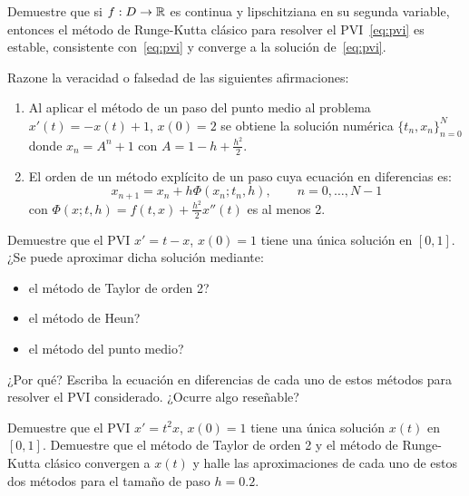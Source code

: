\begin{ejercicio}\label{ej:3.1.5}
    Demuestre que si $f : D \to \mathbb{R}$ es continua y lipschitziana en su segunda variable, entonces el método de Runge-Kutta clásico para resolver el PVI~\eqref{eq:pvi} es estable, consistente con~\eqref{eq:pvi} y converge a la solución de~\eqref{eq:pvi}.
\end{ejercicio}

\begin{ejercicio}\label{ej:3.1.6}
    Razone la veracidad o falsedad de las siguientes afirmaciones:
    \begin{enumerate}
        \item Al aplicar el método de un paso del punto medio al problema $x'(t) = -x(t) + 1$, $x(0) = 2$ se obtiene la solución numérica $\{t_n, x_n\}_{n=0}^N$ donde $x_n = A^n + 1$ con $A = 1 - h + \frac{h^2}{2}$.
        \item El orden de un método explícito de un paso cuya ecuación en diferencias es:
        \begin{equation*}
            x_{n+1} = x_n + h \Phi(x_n; t_n, h),\qquad n = 0, \ldots, N-1
        \end{equation*}
        con $\Phi(x; t, h) = f(t, x) + \frac{h^2}{2} x''(t)$ es al menos 2.
    \end{enumerate}
\end{ejercicio}

\begin{ejercicio}\label{ej:3.1.7}
    Demuestre que el PVI $x' = t - x$, $x(0) = 1$ tiene una única solución en $[0, 1]$. ¿Se puede aproximar dicha solución mediante:
    \begin{itemize}
        \item el método de Taylor de orden 2?
        \item el método de Heun?
        \item el método del punto medio?
    \end{itemize}
    ¿Por qué? Escriba la ecuación en diferencias de cada uno de estos métodos para resolver el PVI considerado. ¿Ocurre algo reseñable?
\end{ejercicio}

\begin{ejercicio}\label{ej:3.1.8}
    Demuestre que el PVI $x' = t^2 x$, $x(0) = 1$ tiene una única solución $x(t)$ en $[0, 1]$. Demuestre que el método de Taylor de orden 2 y el método de Runge-Kutta clásico convergen a $x(t)$ y halle las aproximaciones de cada uno de estos dos métodos para el tamaño de paso $h = 0.2$.
\end{ejercicio}

